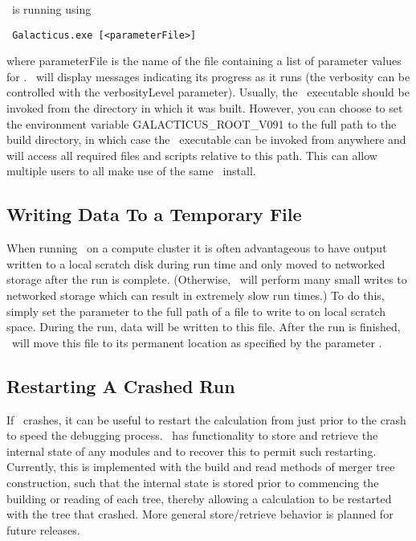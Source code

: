 \glc\ is running using
\begin{verbatim}
 Galacticus.exe [<parameterFile>]
\end{verbatim}
where {\normalfont \ttfamily parameterFile} is the name of the file containing a list of parameter values for \glc. \glc\ will display messages indicating its progress as it runs (the verbosity can be controlled with the {\normalfont \ttfamily verbosityLevel} parameter). Usually, the \glc\ executable should be invoked from the directory in which it was built. However, you can choose to set the environment variable {\normalfont \ttfamily GALACTICUS\_ROOT\_V091} to the full path to the build directory, in which case the \glc\ executable can be invoked from anywhere and will access all required files and scripts relative to this path. This can allow multiple users to all make use of the same \glc\ install.

\subsection{Writing Data To a Temporary File}

When running \glc\ on a compute cluster it is often advantageous to have output written to a local scratch disk during run time and only moved to networked storage after the run is complete. (Otherwise, \glc\ will perform many small writes to networked storage which can result in extremely slow run times.) To do this, simply set the parameter {\normalfont \ttfamily [galacticusOutputScratchFileName]} to the full path of a file to write to on local scratch space. During the run, data will be written to this file. After the run is finished, \glc\ will move this file to its permanent location as specified by the parameter {\normalfont \ttfamily [galacticusOutputFileName]}.

\subsection{Restarting A Crashed Run}\label{sec:Restarting}

If \glc\ crashes, it can be useful to restart the calculation from just prior to the crash to speed the debugging process. \glc\ has functionality to store and retrieve the internal state of any modules and to recover this to permit such restarting. Currently, this is implemented with the {\normalfont \ttfamily build} and {\normalfont \ttfamily read} methods of merger tree construction, such that the internal state is stored prior to commencing the building or reading of each tree, thereby allowing a calculation to be restarted with the tree that crashed. More general store/retrieve behavior is planned for future releases.

